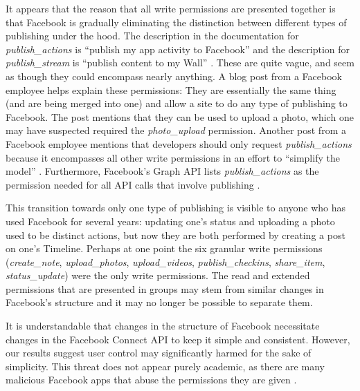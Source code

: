 \documentclass{sig-alternate}
\begin{document}

It appears that the reason that all write permissions are presented together is that Facebook is gradually eliminating the distinction between different types of publishing under the hood. The description in the documentation for \emph{publish\_actions} is ``publish my app activity to Facebook'' and the description for \emph{publish\_stream} is ``publish content to my Wall'' \cite{fbpermissions}. These are quite vague, and seem as though they could encompass nearly anything. A blog post from a Facebook employee \cite{publishperms} helps explain these permissions: They are essentially the same thing (and are being merged into one) and allow a site to do any type of publishing to Facebook. The post mentions that they can be used to upload a photo, which one may have suspected required the \emph{photo\_upload} permission. Another post from a Facebook employee mentions that developers should only request \emph{publish\_actions} because it encompasses all other write permissions in an effort to ``simplify the model'' \cite{clarity}. Furthermore, Facebook's Graph API lists \emph{publish\_actions} as the permission needed for all API calls that involve publishing \cite{fbapi}.

This transition towards only one type of publishing is visible to anyone who has used Facebook for several years: updating one's status and uploading a photo used to be distinct actions, but now they are both performed by creating a post on one's Timeline. Perhaps at one point the six granular write permissions (\emph{create\_note}, \emph{upload\_photos}, \emph{upload\_videos}, \emph{publish\_checkins}, \emph{share\_item}, \emph{status\_update}) were the only write permissions. The read and extended permissions that are presented in groups may stem from similar changes in Facebook's structure and it may no longer be possible to separate them. %

It is understandable that changes in the structure of Facebook necessitate changes in the Facebook Connect API to keep it simple and consistent. However, our results suggest user control may significantly harmed for the sake of simplicity. This threat does not appear purely academic, as there are many malicious Facebook apps that abuse the permissions they are given \cite{isappsafe,frappe}.
\end{document}
